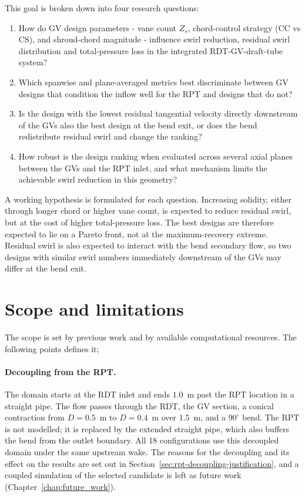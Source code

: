This goal is broken down into four research questions:
\begin{enumerate}
  \item How do GV design parameters - vane count $Z_s$, chord-control strategy (CC vs CS), and shroud-chord magnitude - influence swirl reduction, residual swirl distribution and total-pressure loss in the integrated RDT-GV-draft-tube system?
  \item Which spanwise and plane-averaged metrics best discriminate between GV designs that condition the inflow well for the RPT and designs that do not?
  \item Is the design with the lowest residual tangential velocity directly downstream of the GVs also the best design at the bend exit, or does the bend redistribute residual swirl and change the ranking?
  \item How robust is the design ranking when evaluated across several axial planes between the GVs and the RPT inlet, and what mechanism limits the achievable swirl reduction in this geometry?
\end{enumerate}

A working hypothesis is formulated for each question. Increasing solidity, either through longer chord or higher vane count, is expected to reduce residual swirl, but at the cost of higher total-pressure loss. The best designs are therefore expected to lie on a Pareto front, not at the maximum-recovery extreme. Residual swirl is also expected to interact with the bend secondary flow, so two designs with similar swirl numbers immediately downstream of the GVs may differ at the bend exit.

\section{Scope and limitations}
\label{sec:scope_limitations}

The scope is set by previous work and by available computational resources. The following points defines it;

\paragraph{Decoupling from the RPT.} The domain starts at the RDT inlet and ends $1.0$~m past the RPT location in a straight pipe. The flow passes through the RDT, the GV section, a conical contraction from $D = 0.5$~m to $D = 0.4$~m over $1.5$~m, and a $90^\circ$ bend. The RPT is not modelled; it is replaced by the extended straight pipe, which also buffers the bend from the outlet boundary. All 18 configurations use this decoupled domain under the same upstream wake. The reasons for the decoupling and its effect on the results are set out in Section~\ref{sec:rpt-decoupling-justification}, and a coupled simulation of the selected candidate is left as future work (Chapter~\ref{chap:future_work}).

